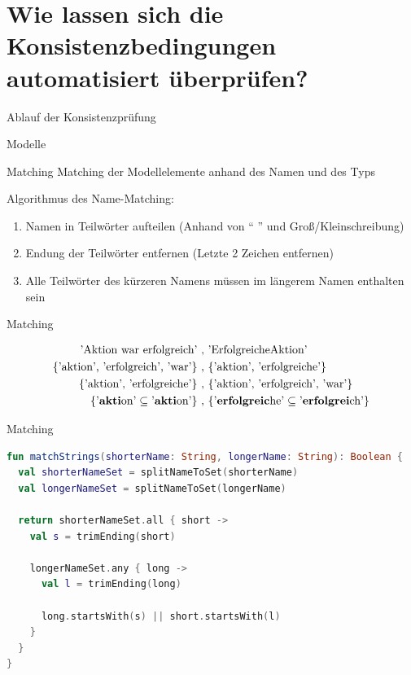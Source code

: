 \section{Wie lassen sich die Konsistenzbedingungen automatisiert überprüfen?}

\begin{frame}{Ablauf der Konsistenzprüfung}
  
\end{frame}

\begin{frame}{Modelle}
  
\end{frame}

\begin{frame}{Matching}
  Matching der Modellelemente anhand des Namen und des Typs

  Algorithmus des Name-Matching:
  \begin{enumerate}
    \item Namen in Teilwörter aufteilen (Anhand von `` '' und Groß/Kleinschreibung)
    \item Endung der Teilwörter entfernen (Letzte 2 Zeichen entfernen)
    \item Alle Teilwörter des kürzeren Namens müssen im längerem Namen enthalten sein
  \end{enumerate}
\end{frame}
\begin{frame}{Matching}
  \begin{figure}
    \centering
    \begin{align}
        \text{'Aktion war erfolgreich'}\ ,&\ \text{'ErfolgreicheAktion'} \nonumber\\
        \text{\{'aktion', 'erfolgreich', 'war'\}}\ ,&\ \text{\{'aktion', 'erfolgreiche'\}} \nonumber\\
        \text{\{'aktion', 'erfolgreiche'\}}\ ,&\ \text{\{'aktion', 'erfolgreich', 'war'\}} \nonumber\\
        \text{\{'\textbf{akti}on'} \subseteq \text{'\textbf{akti}on'\}}\ ,&\ \text{\{'\textbf{erfolgreic}he'} \subseteq \text{'\textbf{erfolgrei}ch'\}} \nonumber
    \end{align}
    \label{eq:name_matching}
  \end{figure}
\end{frame}
\begin{frame}[fragile]{Matching}
\begin{lstlisting}[language=Kotlin]
fun matchStrings(shorterName: String, longerName: String): Boolean {
  val shorterNameSet = splitNameToSet(shorterName)
  val longerNameSet = splitNameToSet(longerName)

  return shorterNameSet.all { short ->
    val s = trimEnding(short)

    longerNameSet.any { long ->
      val l = trimEnding(long)

      long.startsWith(s) || short.startsWith(l)
    }
  }
}
\end{lstlisting}
\end{frame}
